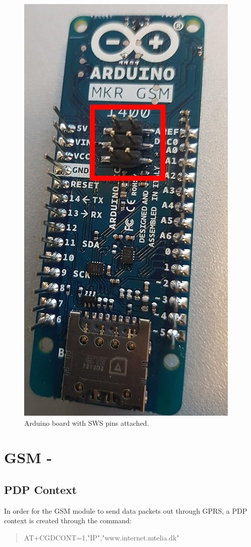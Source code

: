 \begin{figure}
	\centering
	\includegraphics[height=0.4\textheight]{gfx/Implementation/MKR1400BoardSWD.jpg}
	\caption{Arduino \MKR board with SWS pins attached.}
	\label{fig:debugpins}
\end{figure}

\section{GSM - \SARA}
\subsection{PDP Context}
In order for the GSM module to send data packets out through GPRS, a PDP context is created through the command:
\begin{quote}
	AT+CGDCONT=1,"IP","www.internet.mtelia.dk"
\end{quote}

